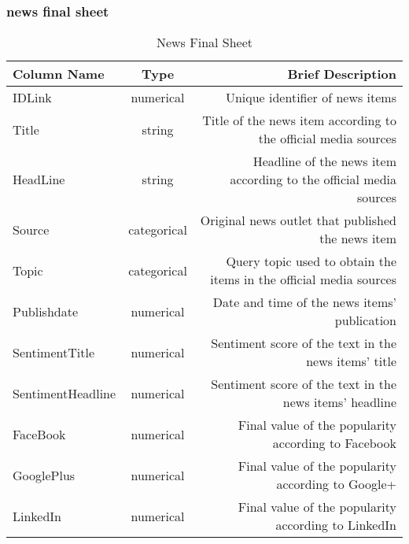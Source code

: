 \documentclass[10pt]{article}
\begin{document}
\subsubsection{news final sheet}
\begin{table}[h!]
    \begin{center}
      \caption{News Final Sheet}
      \label{tab:table1}
      \begin{tabular}{l|c|r} 
        \textbf{Column Name} & \textbf{Type} & \textbf{Brief Description}\\
        \hline
        IDLink & numerical & Unique identifier of news items\\
        Title & string & Title of the news item according to the official media sources\\
        HeadLine & string & Headline of the news item according to the official media sources\\
        Source & categorical & Original news outlet that published the news item\\
        Topic & categorical & Query topic used to obtain the items in the official media sources\\
        Publishdate & numerical & Date and time of the news items' publication\\
        SentimentTitle & numerical & Sentiment score of the text in the news items' title\\
        SentimentHeadline & numerical & Sentiment score of the text in the news items' headline\\
        FaceBook & numerical & Final value of the popularity according to Facebook\\
        GooglePlus & numerical & Final value of the popularity according to Google+\\
        LinkedIn & numerical & Final value of the popularity according to LinkedIn\\
      \end{tabular}
    \end{center}
  \end{table}
\end{document}
